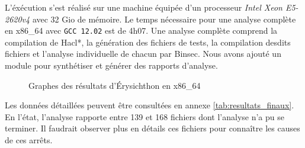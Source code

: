 L'éxécution s'est réalisé sur une machine équipée d'un processeur \textit{Intel Xeon E5-2620v4} avec 32 Gio de mémoire. Le temps nécessaire pour une analyse complète en x86\_64 avec \texttt{GCC 12.02} est de 4h07. Une analyse complète comprend la compilation de Hacl*, la génération des fichiers de tests, la compilation desdits fichiers et l'analyse individuelle de chacun par Binsec. Nous avons ajouté un module pour synthétiser et générer des rapports d'analyse.\medbreak


\begin{figure}[!ht]
  \centering
  \caption{Graphes des résultats d'Érysichthon en x86\_64}
  \label{fig:graphe_total}
\end{figure}


Les données détaillées peuvent être consultées en annexe \ref{tab:resultats_finaux}. En l'état, l'analyse rapporte entre 139 et 168 fichiers dont l'analyse n'a pu se terminer. Il faudrait observer plus en détails ces fichiers pour connaître les causes de ces arrêts. \medbreak


